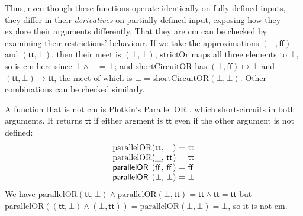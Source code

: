 \begin{example}
  Thus, even though these functions operate identically on fully defined inputs, they differ in their
  \emph{derivatives} on partially defined input, exposing how they explore their arguments differently. That
  they are cm can be checked by examining their restrictions' behaviour. If we take the approximations
  $(\bot,\mathsf{ff})$ and $(\mathsf{tt},\bot)$, then their meet is $(\bot,\bot)$; $\mathrm{strictOr}$ maps
  all three elements to $\bot$, so is cm here since $\bot \wedge \bot = \bot$; and $\mathrm{shortCircuitOR}$
  has $(\bot,\mathsf{ff}) \mapsto \bot$ and $(\mathsf{tt},\bot) \mapsto \mathsf{tt}$, the meet of which is
  $\bot = \mathrm{shortCircuitOR}(\bot,\bot)$. Other combinations can be checked similarly.
\end{example}

\begin{example}
  \label{ex:parallel-or}
  A function that is not cm is Plotkin's Parallel OR \cite{lcf77}, which short-circuits in both arguments. It returns $\mathsf{tt}$ if either argment is $\mathsf{tt}$ even if the other argument is not defined:
  \begin{displaymath}
    \begin{array}{l@{(}l@{,~}l@{)~}c@{~}l}
      \mathrm{parallelOR}&\mathsf{tt}&\_&=&\mathsf{tt} \\
      \mathrm{parallelOR}&\_&\mathsf{tt}&=&\mathsf{tt} \\
      \mathsf{parallelOR}&\mathsf{ff}&\mathsf{ff}&=&\mathsf{ff} \\
      \mathsf{parallelOR}&\bot&\bot&=&\bot
    \end{array}
  \end{displaymath}
  We have $\mathrm{parallelOR}(\mathsf{tt}, \bot) \wedge \mathrm{parallelOR}(\bot, \mathsf{tt}) = \mathsf{tt} \wedge \mathsf{tt} = \mathsf{tt}$ but $\mathrm{parallelOR}((\mathsf{tt},\bot) \wedge (\bot, \mathsf{tt})) = \mathrm{parallelOR}(\bot, \bot) = \bot$, so it is not cm.


\end{example}
